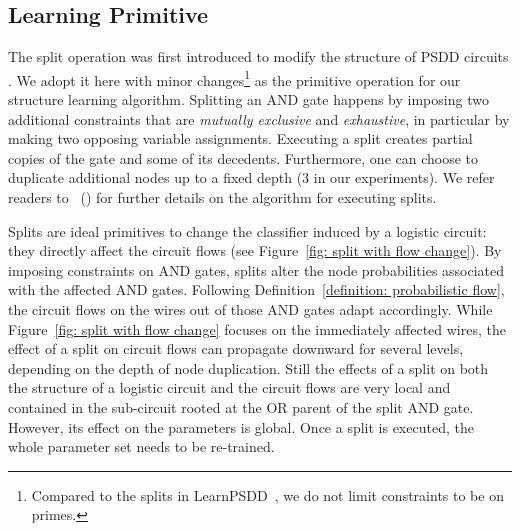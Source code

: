 \documentclass[letterpaper]{article} %
\newcommand{\citet}[1]{\citeauthor{#1}~(\citeyear{#1})}
\begin{document}
\subsection{Learning Primitive}
The split operation was first introduced to modify the structure of PSDD circuits \cite{Liang2017}. We adopt it here with minor changes\footnote{Compared to the splits in LearnPSDD~\cite{Liang2017}, we do not limit constraints to be on primes.} as the primitive operation for our structure learning algorithm.
Splitting an AND gate happens by imposing two additional constraints that are \emph{mutually exclusive} and \emph{exhaustive}, in particular by making two opposing variable assignments.
Executing a split creates partial copies of the gate and some of its decedents. Furthermore, one can choose to duplicate additional nodes up to a fixed depth (3 in our experiments).
We refer readers to \citet{Liang2017} for further details on the algorithm for executing splits.

Splits are ideal primitives to change the classifier induced by a logistic circuit: they directly affect the circuit flows (see Figure~\ref{fig: split with flow change}). By imposing constraints on AND gates, splits alter the node probabilities associated with the affected AND gates. Following Definition~\ref{definition: probabilistic flow}, the circuit flows on the wires out of those AND gates adapt accordingly. While Figure~\ref{fig: split with flow change} focuses on the immediately affected wires, the effect of a split on circuit flows can propagate downward for several levels, depending on the depth of node duplication. Still the effects of a split on both the structure of a logistic circuit and the circuit flows are very local and contained in the sub-circuit rooted at the OR parent of the split AND gate. However, its effect on the parameters is global. Once a split is executed, the whole parameter set needs to be re-trained.
\end{document}
